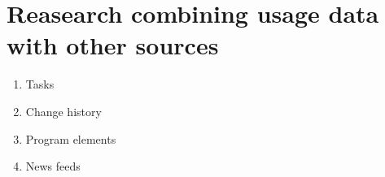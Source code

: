 \section{ Reasearch combining usage data with other sources}

  \begin{enumerate}
  \item Tasks 
  \item Change history
  \item Program elements
  \item News feeds
  \end{enumerate}